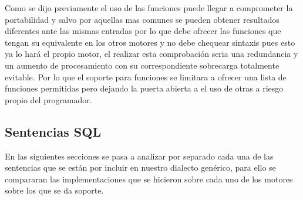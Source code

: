 Como se dijo previamente el uso de las funciones puede llegar a comprometer la portabilidad y salvo por aquellas mas comunes se pueden obtener resultados diferentes ante las mismas entradas por lo que \jj debe ofrecer las funciones que tengan su equivalente en los otros motores y no debe chequear sintaxis pues esto ya lo hará el propio motor, el realizar esta comprobación seria una redundancia y un aumento de procesamiento con su correspondiente sobrecarga totalmente evitable. Por lo que el soporte para funciones se limitara a ofrecer una lista de funciones permitidas pero dejando la puerta abierta a el uso de otras a riesgo propio del programador.


\subsection{Sentencias SQL}
En las siguientes secciones se pasa a analizar por separado cada una de las sentencias que se están por incluir en nuestro dialecto genérico, para ello se compararan las implementaciones que se hicieron sobre cada uno de los motores sobre los que se da soporte.

